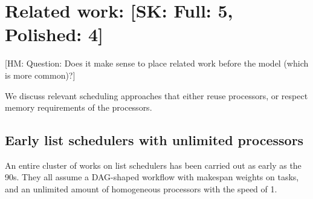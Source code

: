 \documentclass[conference]{IEEEtran}
\newcommand{\skug}[1]{{\color{blue}[SK: #1]}}
\newcommand{\hmey}[1]{{\color{red}[HM: #1]}}
\begin{document}
%
%
%


    \section{Related work: \skug{Full: 5, Polished: 4}}
    \label{sec:related-work}
    
    \hmey{Question: Does it make sense to place related work before the model (which is more common)?}

    We discuss relevant scheduling approaches that either reuse processors, or respect memory requirements of the processors.

    \subsection{Early list schedulers with unlimited processors}
    An entire cluster of works on list schedulers has been carried out as early as the 90s.
    They all assume a DAG-shaped workflow with makespan weights on tasks, and an unlimited amount of homogeneous processors
    with the speed of 1.
\end{document}
